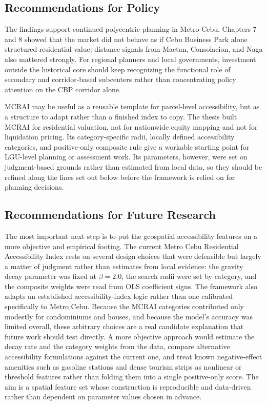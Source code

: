 \subsection{Recommendations for Policy}\label{recommendations-for-policy}

The findings support continued polycentric planning in Metro Cebu. Chapters 7 and 8 showed that the market did not behave as if Cebu Business Park alone structured residential value; distance signals from Mactan, Consolacion, and Naga also mattered strongly. For regional planners and local governments, investment outside the historical core should keep recognizing the functional role of secondary and corridor-based subcenters rather than concentrating policy attention on the CBP corridor alone.

MCRAI may be useful as a reusable template for parcel-level accessibility, but as a structure to adapt rather than a finished index to copy. The thesis built MCRAI for residential valuation, not for nationwide equity mapping and not for liquidation pricing. Its category-specific radii, locally defined accessibility categories, and positive-only composite rule give a workable starting point for LGU-level planning or assessment work. Its parameters, however, were set on judgment-based grounds rather than estimated from local data, so they should be refined along the lines set out below before the framework is relied on for planning decisions.

\subsection{Recommendations for Future Research}\label{recommendations-for-future-research}

The most important next step is to put the geospatial accessibility features on a more objective and empirical footing. The current Metro Cebu Residential Accessibility Index rests on several design choices that were defensible but largely a matter of judgment rather than estimates from local evidence: the gravity decay parameter was fixed at $\beta = 2.0$, the search radii were set by category, and the composite weights were read from OLS coefficient signs. The framework also adapts an established accessibility-index logic rather than one calibrated specifically to Metro Cebu. Because the MCRAI categories contributed only modestly for condominiums and houses, and because the model's accuracy was limited overall, these arbitrary choices are a real candidate explanation that future work should test directly. A more objective approach would estimate the decay rate and the category weights from the data, compare alternative accessibility formulations against the current one, and treat known negative-effect amenities such as gasoline stations and dense tourism strips as nonlinear or threshold features rather than folding them into a single positive-only score. The aim is a spatial feature set whose construction is reproducible and data-driven rather than dependent on parameter values chosen in advance.

